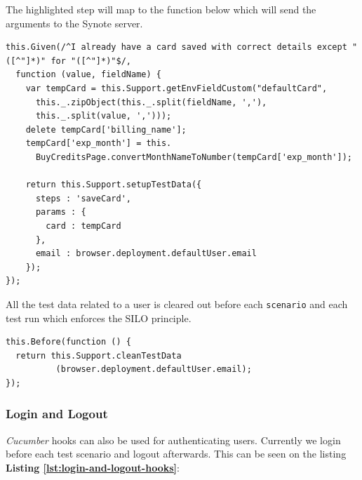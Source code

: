 The highlighted step will map to the function below which will send the arguments to the Synote server.

\begin{listing}[H]
\begin{verbatim}
this.Given(/^I already have a card saved with correct details except "([^"]*)" for "([^"]*)"$/,
  function (value, fieldName) {
    var tempCard = this.Support.getEnvFieldCustom("defaultCard",
      this._.zipObject(this._.split(fieldName, ','),
      this._.split(value, ',')));
    delete tempCard['billing_name'];
    tempCard['exp_month'] = this.
      BuyCreditsPage.convertMonthNameToNumber(tempCard['exp_month']);

    return this.Support.setupTestData({
      steps : 'saveCard',
      params : {
        card : tempCard
      },
      email : browser.deployment.defaultUser.email
    });
});
\end{verbatim}
\label{lst:data-insertion-step-function}
\end{listing}

All the test data related to a user is cleared out before each \texttt{scenario} and each test run which enforces the SILO principle.

\begin{listing}[H]
\begin{verbatim}
this.Before(function () {
  return this.Support.cleanTestData
          (browser.deployment.defaultUser.email);
});
\end{verbatim}
\label{lst:remove-test-data-before-scenario}
\end{listing}

\subsubsection{Login and Logout}
\label{subsubsec:login-and-logout}

\textit{Cucumber} hooks can also be used for authenticating users. Currently we login before each test scenario and logout afterwards. This can be seen on the listing \textbf{Listing \ref{lst:login-and-logout-hooks}}:

